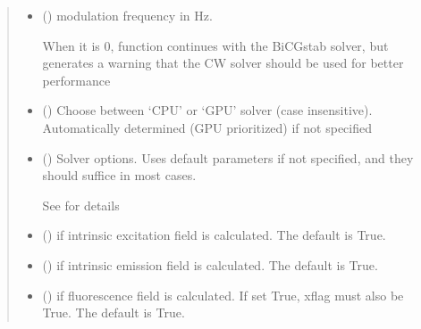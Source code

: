 \documentclass[letterpaper,10pt,english]{sphinxmanual}
\begin{document}
\begin{fulllineitems}
\begin{quote}
\begin{description}
\begin{itemize}
\item {} 
\sphinxAtStartPar
{} () \textendash{} 
\sphinxAtStartPar
modulation frequency in Hz.

\sphinxAtStartPar
When it is 0, function continues with the BiCGstab solver, but generates a warning that the CW solver should be used for better performance


\item {} 
\sphinxAtStartPar
{} (\sphinxstyleliteralemphasis{\sphinxupquote{, }}) \textendash{} Choose between ‘CPU’ or ‘GPU’ solver (case insensitive). Automatically determined (GPU prioritized) if not specified

\item {} 
\sphinxAtStartPar
{} ({\hyperref[\detokenize{_autosummary/nirfasterff.utils.SolverOptions:nirfasterff.utils.SolverOptions}]{}}\sphinxstyleliteralemphasis{\sphinxupquote{, }}) \textendash{} 
\sphinxAtStartPar
Solver options. Uses default parameters if not specified, and they should suffice in most cases.

\sphinxAtStartPar
See {\hyperref[\detokenize{_autosummary/nirfasterff.utils.SolverOptions:nirfasterff.utils.SolverOptions}]{}} for details


\item {} 
\sphinxAtStartPar
{} (\sphinxstyleliteralemphasis{\sphinxupquote{, }}) \textendash{} if intrinsic excitation field is calculated. The default is True.

\item {} 
\sphinxAtStartPar
{} (\sphinxstyleliteralemphasis{\sphinxupquote{, }}) \textendash{} if intrinsic emission field is calculated. The default is True.

\item {} 
\sphinxAtStartPar
{} (\sphinxstyleliteralemphasis{\sphinxupquote{, }}) \textendash{} if fluorescence field is calculated. If set True, xflag must also be True. The default is True.


\end{itemize}
\end{description}
\end{quote}
\end{fulllineitems}
\end{document}
